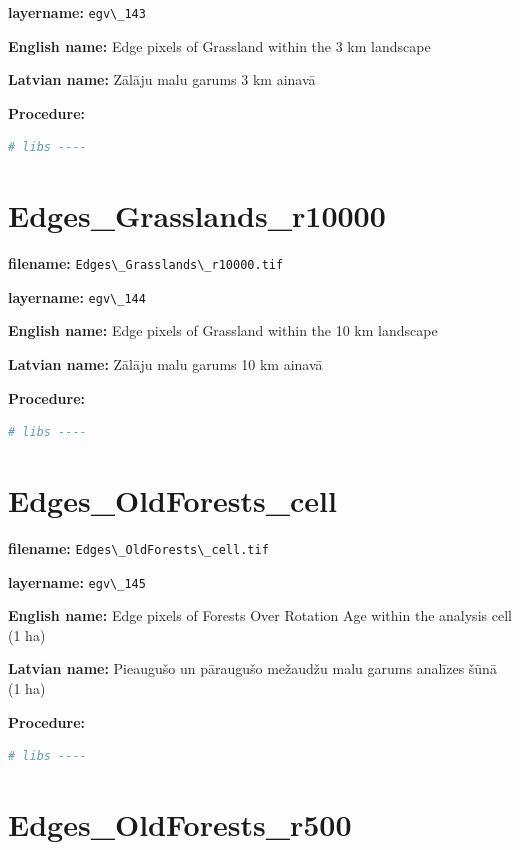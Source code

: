 \documentclass[
]{book}
\newcommand{\passthrough}[1]{#1}
\begin{document}
\textbf{layername:} \passthrough{\lstinline!egv\_143!}

\textbf{English name:} Edge pixels of Grassland within the 3 km landscape

\textbf{Latvian name:} Zālāju malu garums 3 km ainavā

\textbf{Procedure:}

\begin{lstlisting}[language=R]
# libs ----
\end{lstlisting}

\section{Edges\_Grasslands\_r10000}\label{ch06.144}

\textbf{filename:} \passthrough{\lstinline!Edges\_Grasslands\_r10000.tif!}

\textbf{layername:} \passthrough{\lstinline!egv\_144!}

\textbf{English name:} Edge pixels of Grassland within the 10 km landscape

\textbf{Latvian name:} Zālāju malu garums 10 km ainavā

\textbf{Procedure:}

\begin{lstlisting}[language=R]
# libs ----
\end{lstlisting}

\section{Edges\_OldForests\_cell}\label{ch06.145}

\textbf{filename:} \passthrough{\lstinline!Edges\_OldForests\_cell.tif!}

\textbf{layername:} \passthrough{\lstinline!egv\_145!}

\textbf{English name:} Edge pixels of Forests Over Rotation Age within the analysis cell (1 ha)

\textbf{Latvian name:} Pieaugušo un pāraugušo mežaudžu malu garums analīzes šūnā (1 ha)

\textbf{Procedure:}

\begin{lstlisting}[language=R]
# libs ----
\end{lstlisting}

\section{Edges\_OldForests\_r500}\label{ch06.146}
\end{document}
